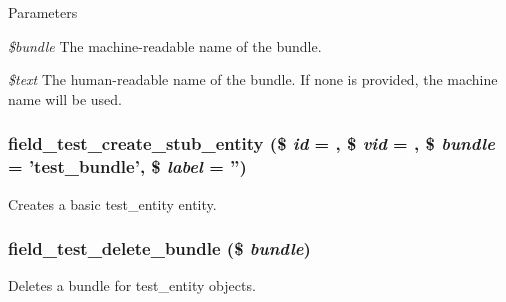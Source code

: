 \begin{DoxyParams}{Parameters}
\item[{\em \$bundle}]The machine-\/readable name of the bundle. \item[{\em \$text}]The human-\/readable name of the bundle. If none is provided, the machine name will be used. \end{DoxyParams}
\hypertarget{field__test_8entity_8inc_af6eb00d8f9f9587e732a1be8b2b784c2}{
\subsubsection[{field\_\-test\_\-create\_\-stub\_\-entity}]{\setlength{\rightskip}{0pt plus 5cm}field\_\-test\_\-create\_\-stub\_\-entity (\$ {\em id} = {}, \/  \$ {\em vid} = {}, \/  \$ {\em bundle} = {\ttfamily 'test\_\-bundle'}, \/  \$ {\em label} = {\ttfamily ''})}}
\label{field__test_8entity_8inc_af6eb00d8f9f9587e732a1be8b2b784c2}
Creates a basic test\_\-entity entity. \hypertarget{field__test_8entity_8inc_a1095cd674ad8f3ff03d9654f5d458209}{
\subsubsection[{field\_\-test\_\-delete\_\-bundle}]{\setlength{\rightskip}{0pt plus 5cm}field\_\-test\_\-delete\_\-bundle (\$ {\em bundle})}}
\label{field__test_8entity_8inc_a1095cd674ad8f3ff03d9654f5d458209}
Deletes a bundle for test\_\-entity objects.



